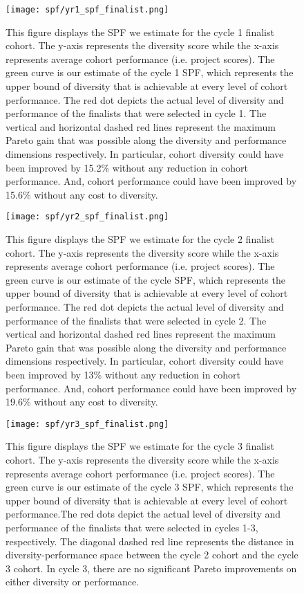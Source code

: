     \newpage
    \begin{figure}[!htb]
    \centering
        \caption{This figure displays the SPF we estimate for the cycle 1 finalist cohort. The y-axis represents the diversity score while the x-axis represents average cohort performance (i.e. project scores). The green curve is our estimate of the cycle 1 SPF, which represents the upper bound of diversity that is achievable at every level of cohort performance. The red dot depicts the actual level of diversity and performance of the finalists that were selected in cycle 1. The vertical and horizontal dashed red lines represent the maximum Pareto gain that was possible along the diversity and performance dimensions respectively. In particular, cohort diversity could have been improved by 15.2\% without any reduction in cohort performance. And, cohort performance could have been improved by 15.6\% without any cost to diversity. } \label{fig:spf_2021}
      \texttt{[image: spf/yr1\_spf\_finalist.png]} 
    \end{figure}
    
    \newpage
    \begin{figure}[!htb]
    \centering
        \caption{This figure displays the SPF we estimate for the cycle 2 finalist cohort. The y-axis represents the diversity score while the x-axis represents average cohort performance (i.e. project scores). The green curve is our estimate of the cycle SPF, which represents the upper bound of diversity that is achievable at every level of cohort performance. The red dot depicts the actual level of diversity and performance of the finalists that were selected in cycle 2. The vertical and horizontal dashed red lines represent the maximum Pareto gain that was possible along the diversity and performance dimensions respectively. In particular, cohort diversity could have been improved by 13\% without any reduction in cohort performance. And, cohort performance could have been improved by 19.6\% without any cost to diversity. } \label{fig:spf_2022}
      \texttt{[image: spf/yr2\_spf\_finalist.png]} 
    \end{figure}
    
    \newpage
    \begin{figure}[!htb]
    \centering
        \caption{This figure displays the SPF we estimate for the cycle 3 finalist cohort. The y-axis represents the diversity score while the x-axis represents average cohort performance (i.e. project scores). The green curve is our estimate of the cycle 3 SPF, which represents the upper bound of diversity that is achievable at every level of cohort performance.The red dots depict the actual level of diversity and performance of the finalists that were selected in cycles 1-3, respectively. The diagonal dashed red line represents the distance in diversity-performance space between the cycle 2 cohort and the cycle 3 cohort. In cycle 3, there are no significant Pareto improvements on either diversity or performance. } \label{fig:spf_2023}
      \texttt{[image: spf/yr3\_spf\_finalist.png]} 
    \end{figure}
    

